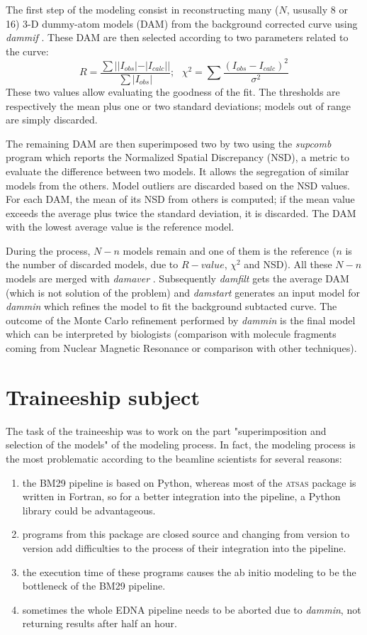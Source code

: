 \documentclass[a4paper, 11pt]{report}
\begin{document}
The first step of the modeling consist in reconstructing many ($N$, ususally 8
or 16) 3-D dummy-atom models (DAM) from the background corrected curve using 
\textit{dammif} \cite{dammif}. 
These DAM are then selected according to two parameters related to the 
curve: 
\[
R = \frac {\sum {||I_{obs}| - |I_{calc}||}}{\sum {|I_{obs}|}}; \ \ \ 
\chi^{2} = \sum {\frac {(I_{obs} - I_{calc})^{2}}{\sigma^{2}}}
\]
These two values allow evaluating the goodness of the fit. 
The thresholds are respectively the mean plus one or two standard 
deviations; models out of range are simply discarded.

The remaining DAM are then superimposed two by two using the 
\textit{supcomb} \cite{supcomb} program which reports the Normalized 
Spatial Discrepancy (NSD), a metric to evaluate the difference between 
two models. 
It allows the segregation of similar models from the others. 
Model outliers are discarded based on the NSD
values.
For each DAM, the mean of its NSD from others is computed; if the mean 
value exceeds the average plus twice the standard deviation, it is 
discarded. 
The DAM with the lowest average value is the reference model.

During the process, $N - n$ models remain and one of them is the 
reference ($n$ is the number of discarded models, due to $R-value$, 
$\chi^{2}$ and NSD). 
All these $N - n$ models are merged with \textit{damaver} 
\cite{damaver}. 
Subsequently \textit{damfilt} gets the average DAM (which is not solution of
the problem) and \textit{damstart} generates an input model for 
\textit{dammin} \cite{dammin} which refines the model to fit the 
background subtacted curve. 
The outcome of the Monte Carlo refinement performed by \textit{dammin} 
is the final model which can be interpreted by biologists (comparison 
with molecule fragments coming from Nuclear Magnetic Resonance or 
comparison with other techniques).

\section{Traineeship subject}

The task of the traineeship was to work on the part "superimposition 
and selection of the models" of the modeling process. 
In fact, the modeling process is the most problematic according to 
the beamline scientists for several reasons:
\begin{enumerate}
\item the BM29 pipeline is based on Python, whereas most
of the \textsc{atsas} package is written in Fortran, so for a better 
integration into the pipeline, a Python library could be advantageous. 
\item programs from this package are closed source and 
changing from version to version add difficulties to the process of 
their integration into the pipeline. 
\item the execution time of these programs causes the ab initio 
modeling to be the bottleneck of the BM29 pipeline. 
\item sometimes the whole EDNA pipeline needs to be aborted 
due to \textit{dammin}, not returning results after half an hour.
\end{enumerate}
\end{document}
